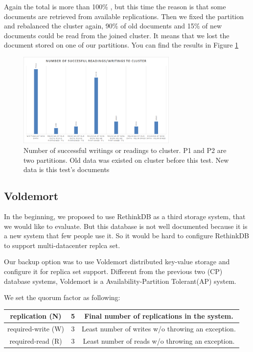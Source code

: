 \documentclass[a4paper]{article}
\begin{document}
Again the total is more than 100\% , but this time the reason is that some documents are retrieved from available replications. 
Then we fixed the partition and rebalanced the cluster again, 90\% of old documents and 15\% of new documents could be read from the joined cluster.
It means that we lost the document stored on one of our partitions.
You can find the results in Figure \ref{fig:diagram7}
\begin{figure}[h!]
	\centering
	\includegraphics[width=0.7\textwidth]{diagram7}
	\caption{Number of successful writings or readings to cluster. P1 and P2 are two partitions. Old data was existed on cluster before this test. New data is this test's documents}
	\label{fig:diagram7}
\end{figure}

\subsection{Voldemort}

In the beginning, we proposed to use RethinkDB as a third storage system, that we would like to evaluate. But this database is not well documented because it is a new system that few people use it. So it would be hard to configure RethinkDB to support multi-datacenter replca set\cite{rethinkdb}.

Our backup option was to use Voldemort distributed key-value storage and configure it for replica set support. Different from the previous two (CP) database systems, Voldemort is a Availability-Partition Tolerant(AP) system\cite{nathan2010}. 

We set the quorum factor as following:

\begin{table}[hb]
  \centering
  \begin{tabular}{|c|c|c|}
    \hline
    replication (N) & 5 & Final number of replications in the system. \\
    \hline
    required-write (W) & 3 & Least number of writes w/o throwing an exception. \\
    \hline
    required-read (R) & 3 & Least number of reads w/o throwing an exception. \\
    \hline
  \end{tabular}
\end{table}
\end{document}
